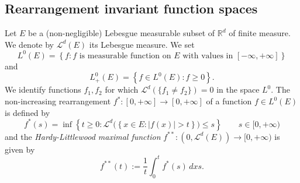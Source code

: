 \documentclass[12pt,a4paper]{amsart}
\theoremstyle{plain}
\newtheorem{thm}{Theorem}[section]
\theoremstyle{definition}
\numberwithin{equation}{section}
\begin{document}
	
	
	\subsection{Rearrangement invariant function spaces}\label{Wales}
	
	Let $E$ be a (non-negligible) Lebesgue measurable subset of $\mathbb R^d$ of finite measure. We denote by $\mathcal{L}^d(E)$ its Lebesgue measure. We set 
	$$
	L^0(E)=\left\{ f: f \text{ is measurable function on } E \text{ with values in }[-\infty, + \infty] \right\}
	$$
	and
	$$L^0_+(E)= \left\{ f\in L^0(E): f\geq 0\right\}.$$
	We identify functions $f_1,f_2$ for which $\mathcal{L}^d(\{f_1\neq f_2\})=0$ in the space $L^0$.
	The non-increasing rearrangement $f^*\colon [0, +\infty] \rightarrow[0, +\infty]$ of a function $f\in L^0(E)$ is defined by
	$$
	f^*(s)=\inf\left\{ t\geq 0: \mathcal{L}^d\big (\left\{x\in E: |f(x)|>t  \right\}\big) \leq s \right\} \qquad s\in [0, + \infty)
	$$
	and the \textit{Hardy-Littlewood maximal function} $f^{**}:(0,\mathcal{L}^d(E))\to [0,+\infty)$ is given by
	$$
	f^{**}(t):=\frac{1}{t}\int_0^t f^*(s)\, dx s.
	$$
	
\end{document}
